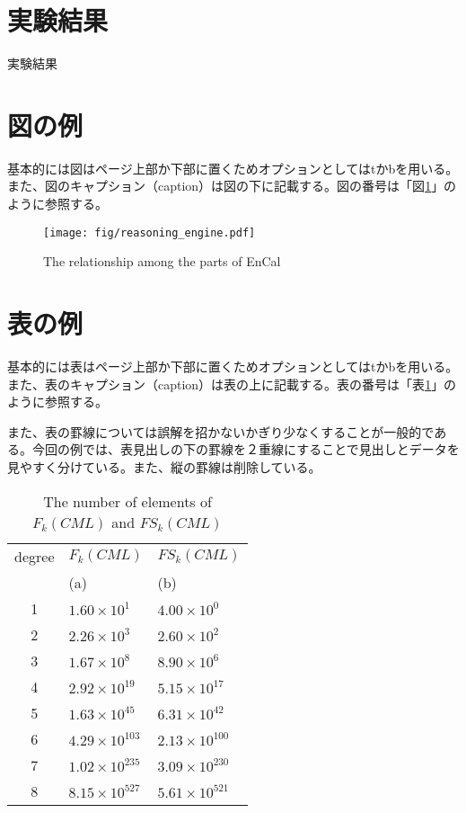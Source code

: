 \documentclass[12pt,dvipdfmx]{jreport}
\begin{document}
 \section{実験結果}
 実験結果


 \section{図の例}

 基本的には図はページ上部か下部に置くためオプションとしてはtかbを用いる。また、図のキャプション（caption）は図の下に記載する。図の番号は「図\ref{fig:reasoning_engine}」のように参照する。

 \begin{figure}[tb]
   \begin{center}
     \texttt{[image: fig/reasoning\_engine.pdf]}
     \caption{The relationship among the parts of EnCal}
     \label{fig:reasoning_engine}
   \end{center}
 \end{figure}

 \section{表の例}

 基本的には表はページ上部か下部に置くためオプションとしてはtかbを用いる。また、表のキャプション（caption）は表の上に記載する。表の番号は「表\ref{tab:num_of_schemata_satisfied_srp}」のように参照する。

また、表の罫線については誤解を招かないかぎり少なくすることが一般的である。今回の例では、表見出しの下の罫線を２重線にすることで見出しとデータを見やすく分けている。また、縦の罫線は削除している。

\begin{table}[tb]
  \begin{center}
  \caption{The number of elements of $F_{k}(CML)$ and $FS_{k}(CML)$}
  \label{tab:num_of_schemata_satisfied_srp}
  \begin{tabular}{c l l}
    \hline
    degree & $F_{k}(CML)$ &$FS_{k}(CML)$ \\
    & (a)&  (b)\\
    \hline
    \hline
    1 &  $1.60 \times 10^{1}$ & $4.00 \times 10^{0}$\\
    2 & $2.26 \times 10^{3}$ & $2.60 \times 10^{2}$  \\
    3 & $1.67 \times 10^{8}$ & $8.90 \times 10^{6}$\\
    4 & $2.92 \times 10^{19}$ & $5.15 \times 10^{17}$\\
    5 & $1.63 \times 10^{45}$ & $6.31 \times 10^{42}$\\
    6 & $4.29 \times 10^{103}$ & $2.13 \times 10^{100}$\\
    7 & $1.02 \times 10^{235}$ & $3.09 \times 10^{230}$\\
    8 & $8.15 \times 10^{527}$ & $5.61 \times 10^{521}$\\
    \hline
  \end{tabular}
  \end{center}
\end{table}
\end{document}
